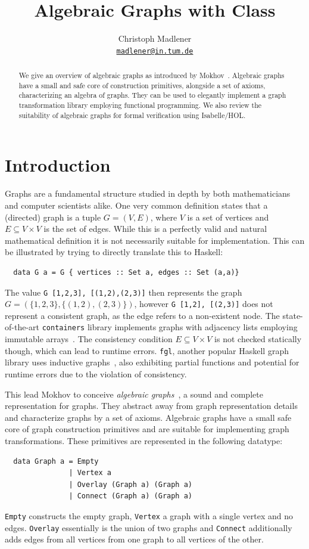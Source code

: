 \documentclass{article}
\title{Algebraic Graphs with Class}
\author{
  Christoph Madlener\\
  \texttt{\href{mailto:madlener@in.tum.de}{madlener@in.tum.de}}
}
\newcommand{\hs}{\texttt}
\begin{document}
\maketitle
\begin{abstract}
  We give an overview of algebraic graphs as introduced by
  Mokhov~\cite{mokhov2017algebraic}. Algebraic graphs have a small and safe core
  of construction primitives, alongside a set of axioms, characterizing an
  algebra of graphs. They can be used to elegantly implement a graph
  transformation library employing functional programming. We also review the
  suitability of algebraic graphs for formal verification using Isabelle/HOL.
\end{abstract}

\section{Introduction}\label{sec:intro}
Graphs are a fundamental structure studied in depth by both mathematicians and
computer scientists alike. One very common definition states that a (directed)
graph is a tuple $G = (V,E)$, where $V$ is a set of vertices and $E \subseteq V
\times V$ is the set of edges. While this is a perfectly valid and natural
mathematical definition it is not necessarily suitable for implementation. This
can be illustrated by trying to directly translate this to Haskell:
\begin{verbatim}
  data G a = G { vertices :: Set a, edges :: Set (a,a)}
\end{verbatim}
The value \hs{G {[1,2,3], [(1,2),(2,3)]}} then represents the graph $G =
(\{1,2,3\}, \{(1,2),(2,3)\})$, however \hs{G {[1,2], [(2,3)]}} does not
represent a consistent graph, as the edge refers to a non-existent node.
The state-of-the-art \texttt{containers} library implements graphs with
adjacency lists employing immutable arrays~\cite{king1995dfs}. The
consistency condition $E \subseteq V \times V$ is not checked statically though,
which can lead to runtime errors. \texttt{fgl}, another popular Haskell graph
library uses inductive graphs~\cite{erwig2001inductive}, also exhibiting partial
functions and potential for runtime errors due to the violation of consistency.

This lead Mokhov to conceive \textit{algebraic
  graphs}~\cite{mokhov2017algebraic}, a sound and complete representation for
graphs. They abstract away from graph representation details and characterize
graphs by a set of axioms. Algebraic graphs have a small safe core of graph
construction primitives and are suitable for implementing graph transformations.
These primitives are represented in the following datatype:
\begin{verbatim}
  data Graph a = Empty
               | Vertex a
               | Overlay (Graph a) (Graph a)
               | Connect (Graph a) (Graph a)
\end{verbatim}
\hs{Empty} constructs the empty graph, \hs{Vertex} a graph with a single vertex
and no edges. \hs{Overlay} essentially is the union of two graphs and
\hs{Connect} additionally adds edges from all vertices from one graph to all
vertices of the other.
\end{document}
